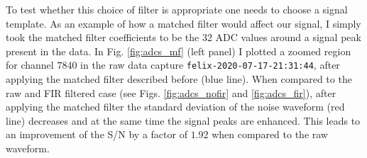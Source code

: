 To test whether this choice of filter is appropriate one needs to choose a signal template. As an example of how a matched filter would affect our signal, I simply took the matched filter coefficients to be the 32 ADC values around a signal peak present in the data. In Fig. \ref{fig:adcs_mf} (left panel) I plotted a zoomed region for channel $7840$ in the raw data capture \texttt{felix-2020-07-17-21:31:44}, after applying the matched filter described before (blue line). When compared to the raw and FIR filtered case (see Figs. \ref{fig:adcs_nofir} and \ref{fig:adcs_fir}), after applying the matched filter the standard deviation of the noise waveform (red line) decreases and at the same time the signal peaks are enhanced. This leads to an improvement of the S/N by a factor of $1.92$ when compared to the raw waveform.

